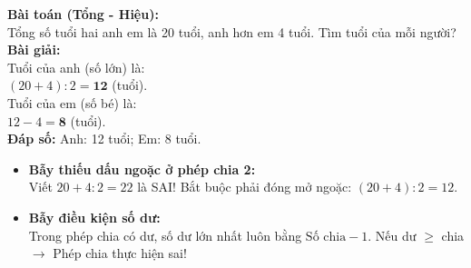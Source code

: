 \documentclass[14pt,a4paper,oneside]{extbook}
\begin{document}
\vspace{-2.5mm}
\noindent
\begin{minipage}[t]{0.49\textwidth}\vspace{0pt}
\begin{tcolorbox}[
  enhanced,
  colback=green!4!white,
  colframe=green!60!black,
  arc=2mm, boxrule=0.8pt,
  left=2mm, right=2mm, top=1.8mm, bottom=1.8mm,
  title={\footnotesize\bfseries\color{white}\faCheckCircle\ Ví dụ thực hành chuẩn mực}
]
{\footnotesize
\textbf{Bài toán (Tổng - Hiệu):}\\
Tổng số tuổi hai anh em là 20 tuổi, anh hơn em 4 tuổi. Tìm tuổi của mỗi người?\\
\textbf{Bài giải:}\\
Tuổi của anh (số lớn) là:\\
$(20 + 4) : 2 = \mathbf{12}$ (tuổi).\\
Tuổi của em (số bé) là:\\
$12 - 4 = \mathbf{8}$ (tuổi).\\
\textbf{Đáp số:} Anh: 12 tuổi; Em: 8 tuổi.
}
\end{tcolorbox}
\end{minipage}
\hfill
\begin{minipage}[t]{0.49\textwidth}\vspace{0pt}
\begin{tcolorbox}[
  enhanced,
  colback=red!4!white,
  colframe=red!70!black,
  arc=2mm, boxrule=0.8pt,
  left=2mm, right=2mm, top=1.8mm, bottom=1.8mm,
  title={\footnotesize\bfseries\color{white}\faExclamationTriangle\ Mẹo tránh bẫy trắc nghiệm}
]
{\footnotesize
\begin{itemize}\setlength{\itemsep}{1.5pt}\setlength{\leftskip}{-2.5mm}
  \item \textbf{Bẫy thiếu dấu ngoặc ở phép chia 2:}\\
  Viết $20 + 4 : 2 = 22$ là SAI! Bắt buộc phải đóng mở ngoặc: $(20 + 4) : 2 = 12$.
  \item \textbf{Bẫy điều kiện số dư:}\\
  Trong phép chia có dư, số dư lớn nhất luôn bằng $\text{Số chia} - 1$. Nếu dư $\ge$ chia $\to$ Phép chia thực hiện sai!
\end{itemize}
}
\end{tcolorbox}
\end{minipage}
\end{document}
